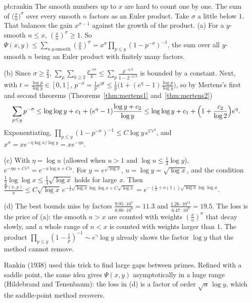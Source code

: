 \begin{solution}{pb:rankin}
\idea The smooth numbers up to $x$ are hard to count one by one. The sum of $\bigl(\frac xn\bigr)^\sigma$ over every smooth $n$ factors as an Euler product. Take $\sigma$ a little below $1$. That balances the gain $x^{\sigma-1}$ against the growth of the product.
\writeup (a) For a $y$-smooth $n\le x$, $(\frac xn)^\sigma\ge1$. So $\Psi(x,y)\le\sum_{n\ y\text{-smooth}}(\frac xn)^\sigma=x^\sigma\prod_{p\le y}(1-p^{-\sigma})^{-1}$, the sum over all
$y$-smooth $n$ being an Euler product with finitely many factors.

(b) Since $\sigma\ge\frac23$, $\sum_p\sum_{k\ge2}\frac{p^{-k\sigma}}k\le\sum_p\frac{p^{-4/3}}{1-2^{-2/3}}$ is bounded by a constant. Next, with $t=\frac{\log p}{\log y}\in[0,1]$,
$p^{-\sigma}=\frac1pe^{\eta t}\le\frac1p\bigl(1+(e^\eta-1)\frac{\log p}{\log y}\bigr)$, so by Mertens's first and second theorems (Theorems~\ref{thm:mertens1} and~\ref{thm:mertens2})
\[
\sum_{p\le y}p^{-\sigma}\le\log\log y+c_1+(e^\eta-1)\frac{\log y+c_2}{\log y}\le\log\log y+c_1+\Bigl(1+\frac{c_2}{\log2}\Bigr)e^\eta.
\]
Exponentiating, $\prod_{p\le y}(1-p^{-\sigma})^{-1}\le C\log y\,e^{Ce^\eta}$, and $x^\sigma=xe^{-\eta\log x/\log y}=xe^{-\eta u}$.

(c) With $\eta=\log u$ (allowed when $u>1$ and $\log u\le\frac13\log y$), $e^{-\eta u+Ce^\eta}=e^{-u\log u+Cu}$. For $y=e^{\sqrt{\log x}}$, $u=\log y=\sqrt{\log x}$, and the condition
$\frac12\log\log x\le\frac13\sqrt{\log x}$ holds for large $x$. Then $\frac{\Psi(x,y)}x\le C\sqrt{\log x}\,e^{-\frac12\sqrt{\log x}\log\log x+C\sqrt{\log x}}=e^{-(\frac12+o(1))\sqrt{\log x}\log\log x}$.

(d) The best bounds miss by factors $\frac{9.95\cdot10^7}{8.80\cdot10^6}=11.3$ and $\frac{1.26\cdot10^{11}}{6.47\cdot10^9}=19.5$. The loss is the price of (a): the smooth $n>x$ are counted with weights
$(\frac xn)^\sigma$ that decay slowly, and a whole range of $n<x$ is counted with weights larger than $1$. The product $\prod_{p\le y}(1-\frac1p)^{-1}\sim e^\gamma\log y$ already shows the
factor $\log y$ that the method cannot remove.

\leads Rankin (1938) used this trick to find large gaps between primes. Refined with a saddle point, the same idea gives $\Psi(x,y)$ asymptotically in a huge range (Hildebrand and Tenenbaum):
the loss in (d) is a factor of order $\sqrt u\,\log y$, which the saddle-point method recovers.
\end{solution}

